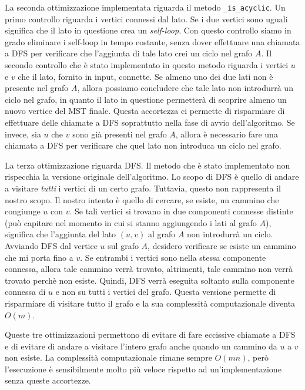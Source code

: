 La seconda ottimizzazione implementata riguarda il metodo
\verb|_is_acyclic|. Un primo controllo riguarda i vertici
connessi dal lato. Se i due vertici sono uguali significa
che il lato in questione crea un \textit{self-loop}. Con
questo controllo siamo in grado eliminare i self-loop in
tempo costante, senza dover effettuare una chiamata a DFS per verificare
che l'aggiunta di tale lato crei un ciclo nel grafo $A$.
Il secondo controllo che è stato implementato in questo metodo
riguarda i vertici $u$ e $v$ che il lato, fornito in input, connette.
Se almeno uno dei due lati non è presente nel grafo $A$, allora
possiamo concludere che tale lato non introdurrà un ciclo nel grafo,
in quanto il lato in questione permetterà di scoprire almeno un nuovo
vertice del MST finale. Questa accortezza ci permette di risparmiare
di effettuare delle chiamate a DFS soprattutto nella fase di avvio
dell'algoritmo. Se invece, sia $u$ che $v$ sono già presenti
nel grafo $A$, allora è necessario fare una chiamata a DFS per verificare
che quel lato non introduca un ciclo nel grafo.

La terza ottimizzazione riguarda DFS. Il metodo che è stato implementato
non rispecchia la versione originale dell'algoritmo. Lo scopo di DFS
è quello di andare a visitare \textit{tutti} i vertici di un certo
grafo. Tuttavia, questo non rappresenta il nostro scopo. Il nostro
intento è quello di cercare, se esiste, un cammino che congiunge $u$ con
$v$. Se tali vertici si trovano in due componenti connesse distinte
(può capitare nel momento in cui si stanno aggiungendo i lati al
grafo $A$), significa che l'aggiunta del lato $(u, v)$ al grafo $A$ non
introdurrà un ciclo. Avviando DFS dal vertice $u$ sul grafo $A$,
desidero verificare se esiste un cammino che mi porta fino a $v$.
Se entrambi i vertici sono nella stessa componente connessa, allora
tale cammino verrà trovato, altrimenti, tale cammino non verrà
trovato perchè non esiste. Quindi, DFS verrà eseguita soltanto sulla
componente connessa di $u$ e non su tutti i vertici del grafo.
Questa versione permette di risparmiare di visitare tutto il grafo
e la sua complessità computazionale diventa $O(m)$.

Queste tre ottimizzazioni permettono di evitare di fare eccissive
chiamate a DFS e di evitare di andare a visitare l'intero grafo
anche quando un cammino da $u$ a $v$ non esiste. La complessità
computazionale rimane sempre $O(mn)$, però l'esecuzione è sensibilmente
molto più veloce rispetto ad un'implementazione senza queste accortezze.


